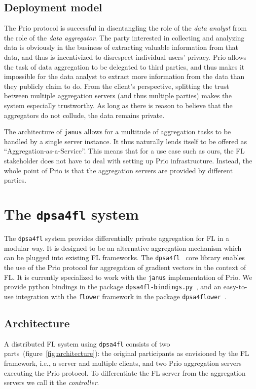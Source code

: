 \documentclass{article}
\begin{document}
\subsection{Deployment model}
The Prio protocol is successful in disentangling the role of the \textit{data
  analyst} from the role of the \textit{data aggregator}. The party interested
in collecting and analyzing data is obviously in the business of extracting valuable
information from that data, and thus is incentivized to disrespect individual
users' privacy. Prio allows the task of data aggregation to be delegated to
third parties, and thus makes it impossible for the data analyst to extract more
information from the data than they publicly claim to do. From the client's
perspective, splitting the trust between multiple aggregation servers (and thus
multiple parties) makes the system especially trustworthy. As long as there is
reason to believe that the aggregators do not collude, the data
remains private.

The architecture of \texttt{janus} allows for a multitude of aggregation tasks
to be handled by a single server instance. It thus naturally lends itself to be
offered as ``Aggregation-as-a-Service''. This means that for a use case such as
ours, the FL stakeholder does not have to deal with setting up Prio
infrastructure. Instead, the whole point of Prio is that the aggregation servers
are provided by different parties.

\section{The \texttt{dpsa4fl} system}
The \texttt{dpsa4fl} system provides differentially private aggregation for FL in a
modular way. It is designed to be an alternative aggregation mechanism which can
be plugged into existing FL frameworks. The \texttt{dpsa4fl}~\cite{dpsa4fl} core library
enables the use of the Prio protocol for aggregation of gradient vectors in the
context of FL. It is currently specialized to work with the \texttt{janus}
implementation of Prio. We provide python bindings in the package
\texttt{dpsa4fl-bindings.py}~\cite{dpsa4fl-bindings}, and an easy-to-use integration with the \texttt{flower}
framework in the package \texttt{dpsa4flower}~\cite{dpsa4flower}.

\subsection{Architecture}
A distributed FL system using \texttt{dpsa4fl} consists of
two parts~(figure~\ref{fig:architecture}): the original participants as envisioned by the FL
framework, i.e., a server and multiple clients, and two Prio aggregation servers
executing the Prio protocol. To differentiate the FL server from the aggregation
servers we call it the \textit{controller}.
\end{document}
